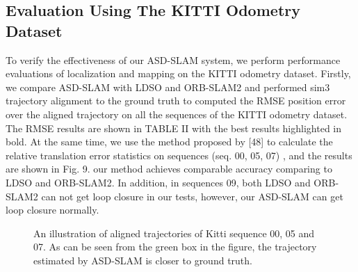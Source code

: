 \documentclass[letterpaper, 10 pt, conference]{ieeeconf}  %
\begin{document}
\subsection{Evaluation Using The KITTI Odometry Dataset}
To verify the effectiveness of our ASD-SLAM system, we perform performance evaluations of localization and mapping on the KITTI odometry dataset. Firstly, we compare ASD-SLAM with LDSO and ORB-SLAM2  and performed sim3 trajectory alignment to the ground truth to computed the RMSE position error over the aligned trajectory on all the sequences of the KITTI odometry dataset. The RMSE results are shown in TABLE II with the best results highlighted in bold. At the same time, we use the method proposed by [48] to calculate the relative translation error statistics on sequences (seq. 00, 05, 07) , and the results are shown in Fig. 9. our method achieves comparable accuracy comparing to LDSO and ORB-SLAM2. In addition,  in sequences 09, both LDSO and ORB-SLAM2 can not get loop closure in our tests, however, our ASD-SLAM can get loop closure normally.
\begin{figure}[H]
\flushleft 
{}%
%

%
%

\caption{An illustration of  aligned trajectories of Kitti sequence 00, 05 and 07. As can be seen from the green box in the figure, the trajectory estimated by ASD-SLAM is closer to ground truth.} 
\end{figure}
\end{document}

